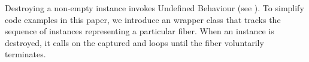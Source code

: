 \newpage
{}\label{launch}\label{appendixa}

Destroying a non-empty \fiber instance invokes Undefined Behaviour
(see ). To simplify code examples in
this paper, we introduce an  wrapper class that tracks the
sequence of \fiber instances representing a particular fiber. When
an  instance is destroyed, it calls \reqstop on the
captured \source and loops until the fiber voluntarily terminates.

